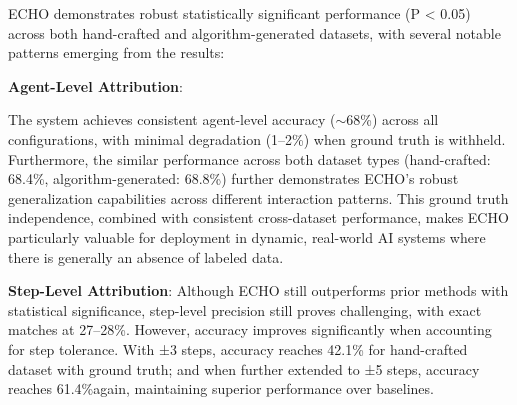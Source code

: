 \documentclass{article}
\begin{document}
ECHO demonstrates robust statistically significant performance (P < 0.05) across both hand-crafted and algorithm-generated datasets, with several notable patterns emerging from the results:

\textbf{Agent-Level Attribution}:

The system achieves consistent agent-level accuracy ($\sim$68\%) across all configurations, with minimal degradation (1--2\%) when ground truth is withheld. Furthermore, the similar performance across both dataset types (hand-crafted: 68.4\%, algorithm-generated: 68.8\%) further demonstrates ECHO's robust generalization capabilities across different interaction patterns. This ground truth independence, combined with consistent cross-dataset performance, makes ECHO particularly valuable for deployment in dynamic, real-world AI systems where there is generally an absence of labeled data.

\textbf{Step-Level Attribution}:
Although ECHO still outperforms prior methods with statistical significance, step-level precision still proves challenging, with exact matches at 27--28\%. However, accuracy improves significantly when accounting for step tolerance. With ±3 steps, accuracy reaches 42.1\% for hand-crafted dataset with ground truth; and when further extended to ±5 steps, accuracy reaches 61.4\%\textemdash again, maintaining superior performance over baselines.
\end{document}
